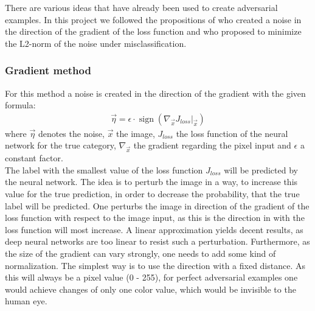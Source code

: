 \documentclass[%
 reprint,
 amsmath,amssymb,
 aps,
]{revtex4-1}
\begin{document}
There are various ideas that have already been used to create adversarial examples. In this project we followed the propositions of \citeauthor{paperGrad} who created a noise in the direction of the gradient of the loss function and \citeauthor{paperMinimize} who proposed to minimize the L2-norm of the noise under misclassification.
\subsubsection*{Gradient method}
For this method a noise is created in the direction of the gradient with the given formula:
\begin{align*}
\vec{\eta} = \epsilon \cdot \operatorname{sign} \left( \nabla_{\vec{x}} J_{loss} \big \vert_{\vec{x}} \right)
\end{align*}
where $\vec{\eta}$ denotes the noise, $\vec{x}$ the image, $J_{loss}$ the loss function of the neural network for the true category,  $\nabla_{\vec{x}}$ the gradient regarding the pixel input and $\epsilon$ a constant factor.\\
The label with the smallest value of the loss function $J_{loss}$ will be predicted by the neural network. The idea is to perturb the image in a way, to increase this value for the true prediction, in order to decrease the probability, that the true label will be predicted. One perturbs the image in direction of the gradient of the loss function with respect to the image input, as this is the direction in with the loss function will most increase. A linear approximation yields decent results, as deep neural networks are too linear to resist such a perturbation. Furthermore, as the size of the gradient can vary strongly, one needs to add some kind of normalization. The simplest way is to use the direction with a fixed distance. As this will always be a pixel value (0 - 255), for perfect adversarial examples one would achieve changes of only one color value, which would be invisible to the human eye. \cite{paperGrad}
\end{document}
